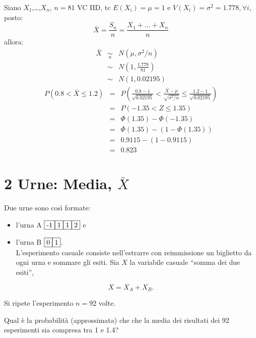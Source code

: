 \documentclass[
  11pt,
]{book}
\providecommand{\tightlist}{%
  \setlength{\itemsep}{0pt}\setlength{\parskip}{0pt}}
\theoremstyle{mytheoremstyle}
\theoremstyle{mydefstyle}
\newenvironment{sol}
  {
  \begin{tcolorbox}[enhanced,breakable,arc=0.1mm,boxrule=1pt,colback=white,colframe=iblue,
  title=\bf \fontfamily{lmss}\selectfont \hspace{.5 cm} Soluzione,drop fuzzy shadow]

}{
\end{tcolorbox}
  }
\begin{document}
\begin{sol}
Siano \(X_1\),\ldots,\(X_n\), \(n=81\) VC IID, tc \(E(X_i)=\mu=1\) e \(V(X_i)=\sigma^2=1.778,\forall i\), posto:
\[
      \bar X=\frac{S_n}n =\frac{X_1 + ... + X_n}n
      \]
allora:\begin{eqnarray*}
  \bar X & \mathop{\sim}\limits_{a}& N(\mu,\sigma^2/n) \\
     &\sim & N\left(1,\frac{1.778}{81}\right) \\
     &\sim & N(1,0.02195)
  \end{eqnarray*}\begin{eqnarray*}
   P( 0.8 < \bar X \leq  1.2 ) &=& P\left( \frac { 0.8  -  1 }{\sqrt{ 0.02195 }} < \frac { \bar X  -  \mu }{ \sqrt{\sigma^2/n} } \leq \frac { 1.2  -  1 }{\sqrt{ 0.02195 }}\right)  \\
              &=& P\left(  -1.35  < Z \leq  1.35 \right) \\
              &=& \Phi( 1.35 )-\Phi( -1.35 )\\
              &=&  \Phi( 1.35 )-(1-\Phi( 1.35 )) \\ &=&  0.9115 -(1- 0.9115 ) \\ 
              &=&  0.823 
   \end{eqnarray*}

\end{sol}

\section{\texorpdfstring{2 Urne: Media, \(\bar{X}\)}{2 Urne: Media, \textbackslash bar\{X\}}}\label{urne-media-barx-1}

Due urne sono così formate:

\begin{itemize}
\tightlist
\item
  l'urna A \({\fbox{-1} \fbox{1} \fbox{1} \fbox{2}}\) e
\item
  l'urna B \({\fbox{0} \fbox{1}}\).\\
  L'esperimento casuale consiste nell'estrarre con reimmissione un
  biglietto da ogni urna e sommare gli esiti. Sia \(X\) la variabile
  casuale ``somma dei due esiti'',
\end{itemize}

\[X=X_{A} + X_{B}.\]

Si ripete l'esperimento \(n=92\) volte.

Qual è la probabilità (approssimata) che che la media dei risultati
dei 92 esperimenti sia compresa tra 1 e 1.4?
\end{document}
